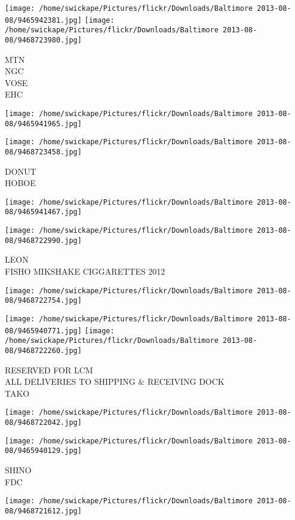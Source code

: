 \documentclass[10pt,letterpaper]{article}
\begin{document}
\texttt{[image: /home/swickape/Pictures/flickr/Downloads/Baltimore 2013-08-08/9465942381.jpg]}
\texttt{[image: /home/swickape/Pictures/flickr/Downloads/Baltimore 2013-08-08/9468723980.jpg]}

MTN\\
NGC\\
VOSE\\
EHC
\pagebreak

\texttt{[image: /home/swickape/Pictures/flickr/Downloads/Baltimore 2013-08-08/9465941965.jpg]}

\vspace{0.25in}
\texttt{[image: /home/swickape/Pictures/flickr/Downloads/Baltimore 2013-08-08/9468723458.jpg]}

DONUT\\
HOBOE
\pagebreak

\texttt{[image: /home/swickape/Pictures/flickr/Downloads/Baltimore 2013-08-08/9465941467.jpg]}

\vspace{0.25in}
\texttt{[image: /home/swickape/Pictures/flickr/Downloads/Baltimore 2013-08-08/9468722990.jpg]}

LEON\\
FISHO MIKSHAKE CIGGARETTES 2012
\pagebreak

\texttt{[image: /home/swickape/Pictures/flickr/Downloads/Baltimore 2013-08-08/9468722754.jpg]}

\vspace{0.25in}
\texttt{[image: /home/swickape/Pictures/flickr/Downloads/Baltimore 2013-08-08/9465940771.jpg]}
\texttt{[image: /home/swickape/Pictures/flickr/Downloads/Baltimore 2013-08-08/9468722260.jpg]}

RESERVED FOR LCM\\
ALL DELIVERIES TO SHIPPING \& RECEIVING DOCK\\
TAKO
\pagebreak

\texttt{[image: /home/swickape/Pictures/flickr/Downloads/Baltimore 2013-08-08/9468722042.jpg]}

\vspace{0.25in}
\texttt{[image: /home/swickape/Pictures/flickr/Downloads/Baltimore 2013-08-08/9465940129.jpg]}

SHINO\\
FDC
\pagebreak

\texttt{[image: /home/swickape/Pictures/flickr/Downloads/Baltimore 2013-08-08/9468721612.jpg]}
\end{document}
